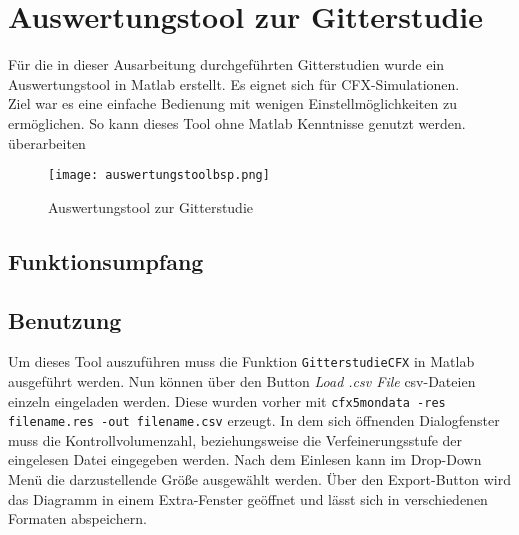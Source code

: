 \chapter{Auswertungstool zur Gitterstudie}
\label{cha:auswertungstool}
Für die in dieser Ausarbeitung durchgeführten Gitterstudien wurde ein Auswertungstool in Matlab erstellt. Es eignet sich für CFX-Simulationen.\\
Ziel war es eine einfache Bedienung mit wenigen Einstellmöglichkeiten zu ermöglichen. So kann dieses Tool ohne Matlab Kenntnisse genutzt werden.
\image überarbeiten
\begin{figure}[htbp]
	\centering
	\label{fig:auswerungbsp}
	\texttt{[image: auswertungstoolbsp.png]}
	\caption{Auswertungstool zur Gitterstudie}
\end{figure}

\section{Funktionsumpfang}
\todo

\section{Benutzung}
Um dieses Tool auszuführen muss die Funktion \texttt{GitterstudieCFX} in Matlab ausgeführt werden. Nun können über den Button \textit{Load .csv File} csv-Dateien einzeln eingeladen werden. Diese wurden vorher mit \texttt{cfx5mondata -res filename.res -out filename.csv} erzeugt. In dem sich öffnenden Dialogfenster muss die Kontrollvolumenzahl, beziehungsweise  die Verfeinerungsstufe der eingelesen Datei eingegeben werden. Nach dem Einlesen kann im Drop-Down Menü die darzustellende Größe ausgewählt werden. Über den Export-Button wird das Diagramm in einem Extra-Fenster geöffnet und lässt sich in verschiedenen Formaten abspeichern.
